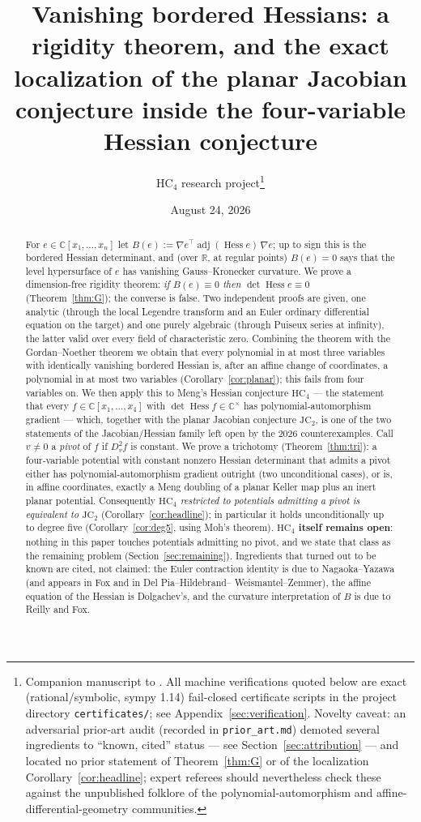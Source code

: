 \documentclass[11pt]{article}
\title{Vanishing bordered Hessians: a rigidity theorem, and the exact
localization of the planar Jacobian conjecture inside the four-variable
Hessian conjecture}
\author{HC$_4$ research project\thanks{Companion manuscript to
\cite{companion}. All machine verifications quoted below are exact
(rational/symbolic, sympy 1.14) fail-closed certificate scripts in the
project directory \texttt{certificates/}; see
Appendix~\ref{sec:verification}. Novelty caveat: an adversarial prior-art
audit (recorded in \texttt{prior\_art.md}) demoted several ingredients to
``known, cited'' status --- see Section~\ref{sec:attribution} --- and
located no prior statement of Theorem~\ref{thm:G} or of the localization
Corollary~\ref{cor:headline}; expert referees should nevertheless check
these against the unpublished folklore of the polynomial-automorphism and
affine-differential-geometry communities.}}
\date{August 24, 2026}
\theoremstyle{plain}
\theoremstyle{definition}
\newcommand{\C}{\mathbb{C}}
\newcommand{\R}{\mathbb{R}}
\newcommand{\Hess}{\operatorname{Hess}}
\newcommand{\adj}{\operatorname{adj}}
\newcommand{\HC}{\mathrm{HC}}
\newcommand{\JC}{\mathrm{JC}}
\begin{document}
\maketitle

\begin{abstract}
For $e\in\C[x_1,\dots,x_n]$ let
$B(e):=\nabla e^{\top}\adj(\Hess e)\,\nabla e$; up to sign this is the
bordered Hessian determinant, and (over $\R$, at regular points)
$B(e)=0$ says that the level hypersurface of $e$ has vanishing
Gauss--Kronecker curvature. We prove a dimension-free rigidity theorem:
\emph{if $B(e)\equiv0$ then $\det\Hess e\equiv0$}
(Theorem~\ref{thm:G}); the converse is false. Two independent proofs are
given, one analytic (through the local Legendre transform and an Euler
ordinary differential equation on the target) and one purely algebraic
(through Puiseux series at infinity), the latter valid over every field of
characteristic zero. Combining the theorem with the Gordan--Noether
theorem we obtain that every polynomial in at most three variables with
identically vanishing bordered Hessian is, after an affine change of
coordinates, a polynomial in at most two variables
(Corollary~\ref{cor:planar}); this fails from four variables on. We then
apply this to Meng's Hessian conjecture $\HC_4$ --- the statement that
every $f\in\C[x_1,\dots,x_4]$ with $\det\Hess f\in\C^{\times}$ has
polynomial-automorphism gradient --- which, together with the planar
Jacobian conjecture $\JC_2$, is one of the two statements of the
Jacobian/Hessian family left open by the 2026 counterexamples. Call
$v\neq0$ a \emph{pivot} of $f$ if $D_v^2f$ is constant. We prove a
trichotomy (Theorem~\ref{thm:tri}): a four-variable potential with
constant nonzero Hessian determinant that admits a pivot either has
polynomial-automorphism gradient outright (two unconditional cases), or
is, in affine coordinates, exactly a Meng doubling of a planar Keller map
plus an inert planar potential. Consequently \emph{$\HC_4$ restricted to
potentials admitting a pivot is equivalent to $\JC_2$}
(Corollary~\ref{cor:headline}); in particular it holds unconditionally up
to degree five (Corollary~\ref{cor:deg5}, using Moh's theorem).
\textbf{$\HC_4$ itself remains open}: nothing in this paper touches
potentials admitting no pivot, and we state that class as the remaining
problem (Section~\ref{sec:remaining}). Ingredients that turned out to be
known are cited, not claimed: the Euler contraction identity is due to
Nagaoka--Yazawa (and appears in Fox and in Del Pia--Hildebrand--%
Weismantel--Zemmer), the affine equation of the Hessian is Dolgachev's,
and the curvature interpretation of $B$ is due to Reilly and Fox.
\end{abstract}
\end{document}
